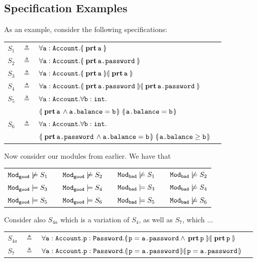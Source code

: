 \subsection{Specification Examples}
\noindent
As an example, consider the following    specifications:

\begin{tabular}{lcll}
$S_1$   &     $\triangleq$   & $\OneStateQ{\prg{a}:\prg{Account} } {\inside{\prg{a}}} $
 \\
 $S_2$   &     $\triangleq$   & $\OneStateQ{\prg{a}:\prg{Account} } {\inside{\prg{a.password}}} $
 \\
 $S_3$   & $\triangleq$   &  $\TwoStatesQ {\prg{a}:\prg{Account}}  {\inside{\prg{a}}} {\inside{\prg{a}}} $
 \\
 $S_4$   & $\triangleq$   &  $\TwoStatesQ {\prg{a}:\prg{Account}}  {\inside{\prg{a.password}}} {\inside{\prg{a.password}}}$
 \\
$S_5$ & $\triangleq$   &
 $\forall \prg{a}:\prg{Account}.\forall \prg{b}:\prg{int}.$\\
  &  &  $\FirstState{\inside{\prg{a}} \wedge \prg{a.balance}=\prg{b}} 
\  \SecondState{ \prg{a.balance}= \prg{b} }$
\\
$S_6$ & $\triangleq$   &
  $\forall \prg{a}:\prg{Account}.\forall \prg{b}:\prg{int}.$\\
  &  &  $\FirstState{\inside{\prg{a.password}} \wedge \prg{a.balance}=\prg{b}} 
\  \SecondState{ \prg{a.balance}\geq \prg{b} }$
 \end{tabular}

\vspace{.2cm}
Now consider our modules from earlier. We have that

\begin{tabular}{lllllll}
$\ModA \not\models S_1$  & & $\ModA \not\models S_2$ &&  $\ModB \not\models S_1$ &  &$\ModB \not\models S_2$ \\
$\ModA \models S_3$ & &   $\ModA \models S_4$ & &  $\ModB  \models S_3$ & &  $\ModB  \not\models S_4$ \\
$\ModA \models S_5$ & &  $\ModA \models S_6$ & & $\ModB  \models S_5$ & & $\ModB   \not\models S_6$ \\
\end{tabular}

\vspace{.6cm}
Consider also  $S_{4a}$ which is a variation of $S_4$, as well as $S_7$, which ...

\begin{tabular}{lcll}
$S_{4a}$   &     $\triangleq$   &   ${\TwoStatesQ {\prg{a}:\prg{Account}.\prg{p}:\prg{Password}}  {\prg{p}=\prg{a.password} \wedge \inside{\prg{p}}}{\inside{\prg{p}}} }$
 \\
$S_7$ & $\triangleq$   & ${\TwoStatesQ {\prg{a}:\prg{Account}.\prg{p}:\prg{Password}}  {\prg{p}=\prg{a.password}} {\prg{p}=\prg{a.password}} }$
 \end{tabular}
 

